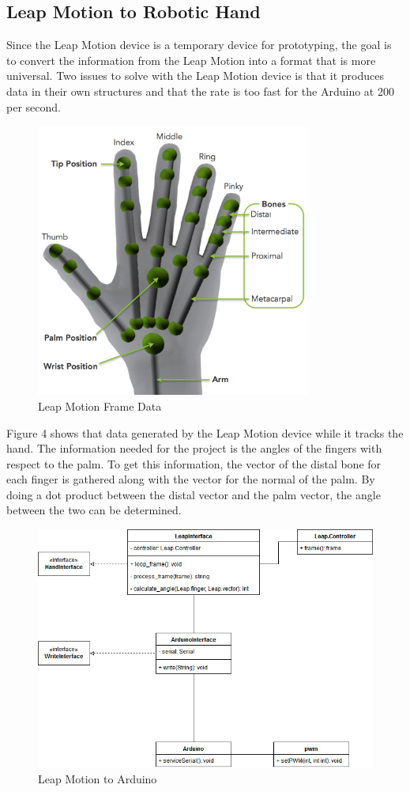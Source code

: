 \documentclass[a4paper,10pt]{article}
\begin{document}
        \subsection{Leap Motion to Robotic Hand}
            Since the Leap Motion device is a temporary device for prototyping, the goal is to convert the information from the Leap Motion into a format that is more universal. Two issues to solve with the Leap Motion device is that it produces data in their own structures and that the rate is too fast for the Arduino at 200 per second.
            \begin{figure}[h]
            \centering
            \includegraphics[width=90mm, scale=0.2]{hand-hierarchy-1024x1024}
            \caption{Leap Motion Frame Data}
            \end{figure}

            Figure 4  shows that data generated by the Leap Motion device while it tracks the hand. The information needed for the project is the angles of the fingers with respect to the palm. To get this information, the vector of the distal bone for each finger is gathered along with the vector for the normal of the palm. By doing a dot product between the distal vector and the palm vector, the angle between the two can be determined.
            \begin{figure}[h]
            \centering
            \includegraphics[width=140mm, scale=1]{LeapMotionArduinoERD}
            \caption{Leap Motion to Arduino}
            \end{figure}
\end{document}
